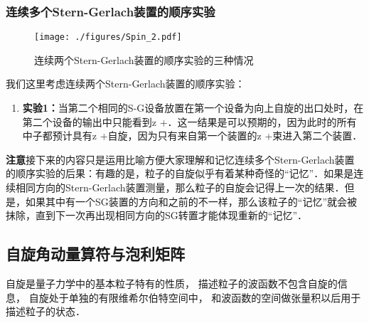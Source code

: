 \subsubsection{连续多个Stern-Gerlach装置的顺序实验}
\begin{figure}[ht]
\centering
\texttt{[image: ./figures/Spin\_2.pdf]}
\caption{连续两个Stern-Gerlach装置的顺序实验的三种情况} \label{Spin_fig2}
\end{figure}
我们这里考虑连续两个Stern-Gerlach装置的顺序实验：
\begin{enumerate}
\item \textbf{实验1：}当第二个相同的S-G设备放置在第一个设备为向上自旋的出口处时，在第二个设备的输出中只能看到z +．这一结果是可以预期的，因为此时的所有中子都预计具有z +自旋，因为只有来自第一个装置的z +束进入第二个装置．
\end{enumerate}
\textbf{注意}接下来的内容只是运用比喻方便大家理解和记忆连续多个Stern-Gerlach装置的顺序实验的后果：有趣的是，粒子的自旋似乎有着某种奇怪的“记忆”．如果是连续相同方向的Stern-Gerlach装置测量，那么粒子的自旋会记得上一次的结果．但是，如果其中有一个SG装置的方向和之前的不一样，那么该粒子的“记忆”就会被抹除，直到下一次再出现相同方向的SG转置才能体现重新的“记忆”．
\subsection{自旋角动量算符与泡利矩阵}

自旋是量子力学中的基本粒子特有的性质， 描述粒子的波函数不包含自旋的信息， 自旋处于单独的有限维希尔伯特空间中， 和波函数的空间做张量积以后用于描述粒子的状态．

